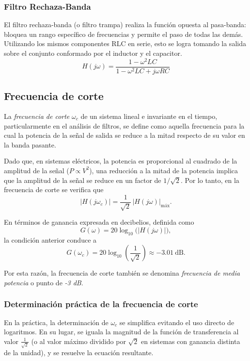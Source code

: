 \subsubsection{Filtro Rechaza-Banda}

El filtro rechaza-banda (o filtro trampa) realiza la función opuesta al pasa-banda: bloquea un rango específico de frecuencias y permite el paso de todas las demás. Utilizando los mismos componentes RLC en serie, esto se logra tomando la salida sobre el conjunto conformado por el inductor y el capacitor.
\begin{equation}
  H(j\omega) = \frac{1 - \omega^2 LC}{1 - \omega^2 LC + j\omega RC}
\end{equation}

\subsection{Frecuencia de corte}

La \textit{frecuencia de corte} \(\omega_c\) de un sistema lineal e invariante en el tiempo, particularmente en el análisis de filtros, se define como aquella frecuencia para la cual la potencia de la señal de salida se reduce a la mitad respecto de su valor en la banda pasante.

Dado que, en sistemas eléctricos, la potencia es proporcional al cuadrado de la amplitud de la señal (\(P \propto V^2\)), una reducción a la mitad de la potencia implica que la amplitud de la señal se reduce en un factor de
\(
1/\sqrt{2}.
\)
Por lo tanto, en la frecuencia de corte se verifica que
\[
|H(j\omega_c)| = \frac{1}{\sqrt{2}}\, |H(j\omega)|_{\text{máx}}.
\]

En términos de ganancia expresada en decibelios, definida como
\[
G(\omega) = 20 \log_{10} \big(|H(j\omega)|\big),
\]
la condición anterior conduce a
\[
G(\omega_c) = 20 \log_{10}\left(\frac{1}{\sqrt{2}}\right) \approx -3.01\ \text{dB}.
\]

Por esta razón, la frecuencia de corte también se denomina \textit{frecuencia de media potencia} o punto de \textit{-3 dB}.

\subsubsection{Determinación práctica de la frecuencia de corte}

En la práctica, la determinación de \(\omega_c\) se simplifica evitando el uso directo de logaritmos. En su lugar, se iguala la magnitud de la función de transferencia al valor \(\frac{1}{\sqrt{2}}\) (o al valor máximo dividido por \(\sqrt{2}\) en sistemas con ganancia distinta de la unidad), y se resuelve la ecuación resultante.

